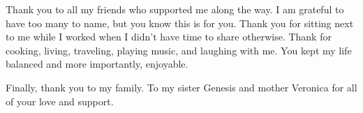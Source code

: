 Thank you to all my friends who supported me along the way. I am grateful to have too many to name, but you know this is for you. Thank you for sitting next to me while I worked when I didn't have time to share otherwise. Thank for cooking, living, traveling, playing music, and laughing with me. You kept my life balanced and more importantly, enjoyable. 

Finally, thank you to my family. To my sister Genesis and mother Veronica for all of your love and support.




